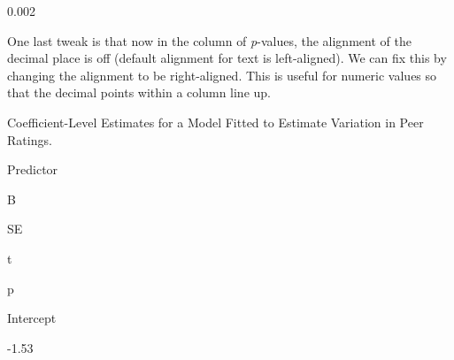 \documentclass[]{book}
\newenvironment{Shaded}{\begin{snugshade}}{\end{snugshade}}
\newcommand{\DataTypeTok}[1]{\textcolor[rgb]{0.13,0.29,0.53}{#1}}
\newcommand{\DecValTok}[1]{\textcolor[rgb]{0.00,0.00,0.81}{#1}}
\newcommand{\KeywordTok}[1]{\textcolor[rgb]{0.13,0.29,0.53}{\textbf{#1}}}
\newcommand{\NormalTok}[1]{#1}
\newcommand{\OperatorTok}[1]{\textcolor[rgb]{0.81,0.36,0.00}{\textbf{#1}}}
\newcommand{\StringTok}[1]{\textcolor[rgb]{0.31,0.60,0.02}{#1}}
\begin{document}
0.002

One last tweak is that now in the column of \emph{p}-values, the alignment of the decimal place is off (default alignment for text is left-aligned). We can fix this by changing the alignment to be right-aligned. This is useful for numeric values so that the decimal points within a column line up.

\begin{Shaded}
\end{Shaded}

\label{tab:unnamed-chunk-19}Coefficient-Level Estimates for a Model Fitted to Estimate Variation in Peer Ratings.

Predictor

B

SE

t

p

Intercept

-1.53
\end{document}
